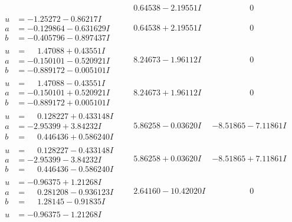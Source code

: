 \documentclass[1p]{elsarticle_modified}
\theoremstyle{definition}
\begin{document}
$$\begin{array}{c|c|c}
 & \phantom{-}0.64538 - 2.19551 I & \phantom{-0.000000 } 0 \\ \hline\begin{aligned}
u &= -1.25272 - 0.86217 I \\
a &= -0.129864 - 0.631629 I \\
b &= -0.405796 - 0.897437 I\end{aligned}
 & \phantom{-}0.64538 + 2.19551 I & \phantom{-0.000000 } 0 \\ \hline\begin{aligned}
u &= \phantom{-}1.47088 + 0.43551 I \\
a &= -0.150101 - 0.520921 I \\
b &= -0.889172 - 0.005101 I\end{aligned}
 & \phantom{-}8.24673 - 1.96112 I & \phantom{-0.000000 } 0 \\ \hline\begin{aligned}
u &= \phantom{-}1.47088 - 0.43551 I \\
a &= -0.150101 + 0.520921 I \\
b &= -0.889172 + 0.005101 I\end{aligned}
 & \phantom{-}8.24673 + 1.96112 I & \phantom{-0.000000 } 0 \\ \hline\begin{aligned}
u &= \phantom{-}0.128227 + 0.433148 I \\
a &= -2.95399 + 3.84232 I \\
b &= \phantom{-}0.446436 + 0.586240 I\end{aligned}
 & \phantom{-}5.86258 - 0.03620 I & -8.51865 - 7.11861 I \\ \hline\begin{aligned}
u &= \phantom{-}0.128227 - 0.433148 I \\
a &= -2.95399 - 3.84232 I \\
b &= \phantom{-}0.446436 - 0.586240 I\end{aligned}
 & \phantom{-}5.86258 + 0.03620 I & -8.51865 + 7.11861 I \\ \hline\begin{aligned}
u &= -0.96375 + 1.21268 I \\
a &= \phantom{-}0.281208 - 0.936123 I \\
b &= \phantom{-}1.28145 - 0.91835 I\end{aligned}
 & \phantom{-}2.64160 - 10.42020 I & \phantom{-0.000000 } 0 \\ \hline\begin{aligned}
u &= -0.96375 - 1.21268 I \\

\end{aligned}
\end{array}$$
\end{document}
